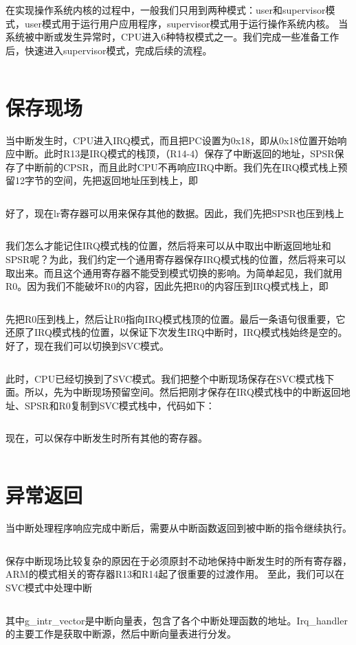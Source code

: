 \documentclass[main.tex]{subfiles}
\begin{document}
\begin{CJK*}{UTF8}{song}
在实现操作系统内核的过程中，一般我们只用到两种模式：user和supervisor模式，user模式用于运行用户应用程序，supervisor模式用于运行操作系统内核。
当系统被中断或发生异常时，CPU进入6种特权模式之一。我们完成一些准备工作后，快速进入supervisor模式，完成后续的流程。
\inputminted[firstline=25,lastline=45,linenos,numbersep=5pt,frame=lines,framesep=2mm]{c}{chapter03/kernel/machdep.h}


\section{保存现场}
当中断发生时，CPU进入IRQ模式，而且把PC设置为0x18，即从0x18位置开始响应中断。此时R13是IRQ模式的栈顶，（R14-4）保存了中断返回的地址，SPSR保存了中断前的CPSR，而且此时CPU不再响应IRQ中断。我们先在IRQ模式栈上预留12字节的空间，先把返回地址压到栈上，即

\inputminted[firstline=39,lastline=41,linenos,numbersep=5pt,frame=lines,framesep=2mm]{gas}{chapter03/kernel/entry.S}

好了，现在lr寄存器可以用来保存其他的数据。因此，我们先把SPSR也压到栈上
\inputminted[firstline=42,lastline=43,linenos,numbersep=5pt,frame=lines,framesep=2mm]{gas}{chapter03/kernel/entry.S}
我们怎么才能记住IRQ模式栈的位置，然后将来可以从中取出中断返回地址和SPSR呢？为此，我们约定一个通用寄存器保存IRQ模式栈的位置，然后将来可以取出来。而且这个通用寄存器不能受到模式切换的影响。为简单起见，我们就用R0。因为我们不能破坏R0的内容，因此先把R0的内容压到IRQ模式栈上，即
\inputminted[firstline=44,lastline=46,linenos,numbersep=5pt,frame=lines,framesep=2mm]{gas}{chapter03/kernel/entry.S}
先把R0压到栈上，然后让R0指向IRQ模式栈顶的位置。最后一条语句很重要，它还原了IRQ模式栈的位置，以保证下次发生IRQ中断时，IRQ模式栈始终是空的。好了，现在我们可以切换到SVC模式。
\inputminted[firstline=47,lastline=50,linenos,numbersep=5pt,frame=lines,framesep=2mm]{gas}{chapter03/kernel/entry.S}
此时，CPU已经切换到了SVC模式。我们把整个中断现场保存在SVC模式栈下面。所以，先为中断现场预留空间。然后把刚才保存在IRQ模式栈中的中断返回地址、SPSR和R0复制到SVC模式栈中，代码如下：
\inputminted[firstline=51,lastline=57,linenos,numbersep=5pt,frame=lines,framesep=2mm]{gas}{chapter03/kernel/entry.S}
现在，可以保存中断发生时所有其他的寄存器。
\inputminted[firstline=58,lastline=61,linenos,numbersep=5pt,frame=lines,framesep=2mm]{gas}{chapter03/kernel/entry.S}

\section{异常返回}
当中断处理程序响应完成中断后，需要从中断函数返回到被中断的指令继续执行。
\inputminted[firstline=64,lastline=69,linenos,numbersep=5pt,frame=lines,framesep=2mm]{gas}{chapter03/kernel/entry.S}
保存中断现场比较复杂的原因在于必须原封不动地保持中断发生时的所有寄存器，ARM的模式相关的寄存器R13和R14起了很重要的过渡作用。
至此，我们可以在SVC模式中处理中断
\inputminted[firstline=145,lastline=151,linenos,numbersep=5pt,frame=lines,framesep=2mm]{gas}{chapter03/kernel/entry.S}
其中g\_intr\_vector是中断向量表，包含了各个中断处理函数的地址。Irq\_handler的主要工作是获取中断源，然后中断向量表进行分发。
\inputminted[firstline=83,lastline=117,linenos,numbersep=5pt,frame=lines,framesep=2mm]{c}{chapter03/kernel/machdep.c}


\end{CJK*}
\end{document}
